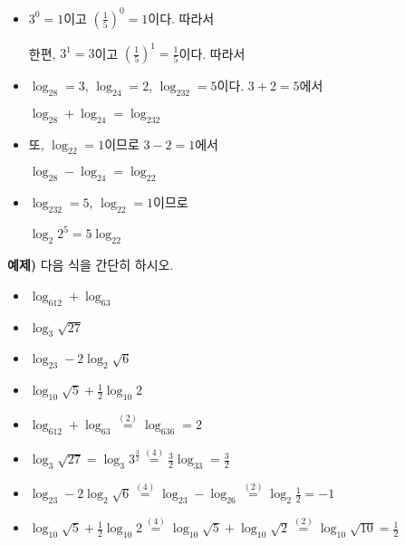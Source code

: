 \documentclass[a4paper,twocolumn]{article}
\begin{document}
\begin{itemize}
\item
\(3^0=1\)이고 \((\frac15)^0=1\)이다.
따라서
\begin{center}
\qquad
{}
\end{center}
한편, \(3^1=3\)이고 \((\frac15)^1=\frac15\)이다.
따라서
\begin{center}
\qquad
{}
\end{center}
\item
\(\log_28=3\), \(\log_24=2\), \(\log_232=5\)이다.
\(3+2=5\)에서
\begin{mdframed}[rightmargin=.1\textwidth,leftmargin=.1\textwidth]
\centering
\(\log_28+\log_24=\log_232\)
\end{mdframed}
\item
또, \(\log_22=1\)이므로 \(3-2=1\)에서
\begin{mdframed}[rightmargin=.1\textwidth,leftmargin=.1\textwidth]
\centering
\(\log_28-\log_24=\log_22\)
\end{mdframed}
\item
\(\log_232=5\), \(\log_22=1\)이므로
\begin{mdframed}[rightmargin=.1\textwidth,leftmargin=.1\textwidth]
\centering
\(\log_2{2^5}=5\log_22\)
\end{mdframed}
\end{itemize}

\par\bigskip\noindent
\textbf{예제)} 다음 식을 간단히 하시오.
\begin{itemize}
\item
\(\log_612+\log_63\)
\item
\(\log_3\sqrt{27}\)
\item
\(\log_23-2\log_2\sqrt6\)
\item
\(\log_{10}\sqrt5+\frac12\log_{10}2\)
\end{itemize}

\noindent
\begin{mdframed}[frametitle=풀이]
\begin{itemize}
\item
\(\log_612+\log_63
\stackrel{(2)}=
\log_636=2\)
\item
\(\log_3\sqrt{27}=\log_3{3^{\frac32}}
\stackrel{(4)}=
\frac32\log_33=\frac32\)
\item
\(\log_23-2\log_2\sqrt6
\stackrel{(4)}=
\log_23-\log_26
\stackrel{(2)}=
\log_2\frac12=-1\)
\item
\(\log_{10}\sqrt5+\frac12\log_{10}2
\stackrel{(4)}=
\log_{10}\sqrt5+\log_{10}\sqrt2
\stackrel{(2)}=
\log_{10}\sqrt{10}=\frac12\)
\end{itemize}
\end{mdframed}
\end{document}
